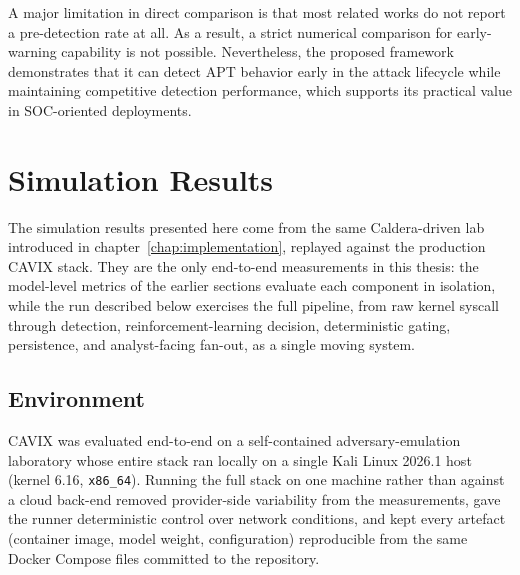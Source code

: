 A major limitation in direct comparison is that most related works do not report a pre-detection rate at all. As a result, a strict numerical comparison for early-warning capability is not possible. Nevertheless, the proposed framework demonstrates that it can detect APT behavior early in the attack lifecycle while maintaining competitive detection performance, which supports its practical value in SOC-oriented deployments.


\section{Simulation Results}
\label{sec:sim-results}

The simulation results presented here come from the same Caldera-driven
lab introduced in chapter~\ref{chap:implementation}, replayed against
the production CAVIX stack. They are the only end-to-end measurements
in this thesis: the model-level metrics of the earlier sections
evaluate each component in isolation, while the run described below
exercises the full pipeline, from raw kernel syscall through
detection, reinforcement-learning decision, deterministic gating,
persistence, and analyst-facing fan-out, as a single moving system.

\subsection{Environment}
\label{sec:sim:env}

CAVIX was evaluated end-to-end on a self-contained adversary-emulation
laboratory whose entire stack ran locally on a single Kali Linux
2026.1 host (kernel 6.16, \texttt{x86\_64}). Running the full stack
on one machine rather than against a cloud back-end removed
provider-side variability from the measurements, gave the runner
deterministic control over network conditions, and kept every
artefact (container image, model weight, configuration) reproducible
from the same Docker \cite{docker2024} Compose files committed to
the repository.

